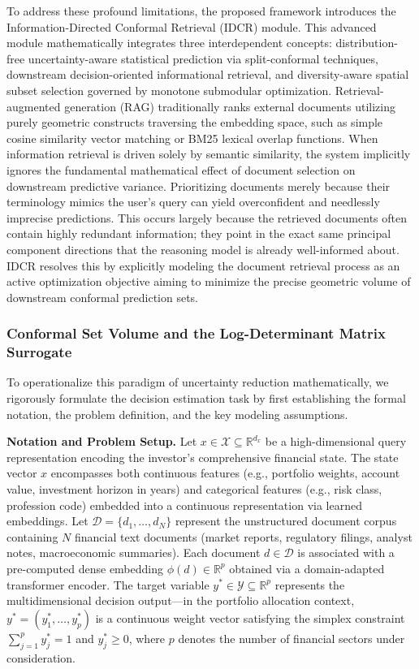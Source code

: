 \documentclass[12pt,a4paper,oneside]{report}
\theoremstyle{definition}
\theoremstyle{remark}
\begin{document}
To address these profound limitations, the proposed framework introduces the Information-Directed Conformal Retrieval (IDCR) module. This advanced module mathematically integrates three interdependent concepts: distribution-free uncertainty-aware statistical prediction via split-conformal techniques, downstream decision-oriented informational retrieval, and diversity-aware spatial subset selection governed by monotone submodular optimization. Retrieval-augmented generation (RAG) traditionally ranks external documents utilizing purely geometric constructs traversing the embedding space, such as simple cosine similarity vector matching or BM25 lexical overlap functions. When information retrieval is driven solely by semantic similarity, the system implicitly ignores the fundamental mathematical effect of document selection on downstream predictive variance. Prioritizing documents merely because their terminology mimics the user's query can yield overconfident and needlessly imprecise predictions. This occurs largely because the retrieved documents often contain highly redundant information; they point in the exact same principal component directions that the reasoning model is already well-informed about. IDCR resolves this by explicitly modeling the document retrieval process as an active optimization objective aiming to minimize the precise geometric volume of downstream conformal prediction sets.

\subsubsection{Conformal Set Volume and the Log-Determinant Matrix Surrogate}

To operationalize this paradigm of uncertainty reduction mathematically, we rigorously formulate the decision estimation task by first establishing the formal notation, the problem definition, and the key modeling assumptions.

\medskip
\noindent\textbf{Notation and Problem Setup.} Let $x \in \mathcal{X} \subseteq \mathbb{R}^{d_x}$ be a high-dimensional query representation encoding the investor's comprehensive financial state. The state vector $x$ encompasses both continuous features (e.g., portfolio weights, account value, investment horizon in years) and categorical features (e.g., risk class, profession code) embedded into a continuous representation via learned embeddings. Let $\mathcal{D} = \{d_1, \ldots, d_N\}$ represent the unstructured document corpus containing $N$ financial text documents (market reports, regulatory filings, analyst notes, macroeconomic summaries). Each document $d \in \mathcal{D}$ is associated with a pre-computed dense embedding $\phi(d) \in \mathbb{R}^{p}$ obtained via a domain-adapted transformer encoder. The target variable $y^* \in \mathcal{Y} \subseteq \mathbb{R}^p$ represents the multidimensional decision output---in the portfolio allocation context, $y^* = (y^*_1, \ldots, y^*_p)$ is a continuous weight vector satisfying the simplex constraint $\sum_{j=1}^p y^*_j = 1$ and $y^*_j \geq 0$, where $p$ denotes the number of financial sectors under consideration.
\end{document}
